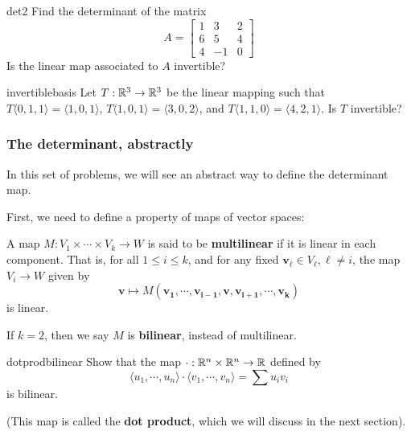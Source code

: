 \begin{problem}{det2}
     Find the determinant of the matrix \begin{equation*}
A = 
\begin{bmatrix}
1 & 3 & 2 \\
6 & 5 & 4 \\
4 & -1 & 0
\end{bmatrix}
\end{equation*}
Is the linear map associated to $A$ invertible?
\end{problem}

\begin{problem}{invertiblebasis}
    Let $T : \mathbb{R}^3 \to \mathbb{R}^3$ be the linear mapping such that $T\langle0,1,1\rangle = \langle1,0,1\rangle$, $T\langle1,0,1\rangle = \langle3,0,2\rangle$, and $T\langle1,1,0\rangle = \langle4,2,1\rangle$.  Is $T$ invertible?
\end{problem}


\subsubsection{The determinant, abstractly}\label{detabstractly}

In this set of problems, we will see an abstract way to define the determinant map.  

First, we need to define a property of maps of vector spaces:

\begin{definition}
    A map $M : V_1 \times \cdots \times V_k \to W$ is said to be \textbf{multilinear} if it is linear in each component.  That is, for all $1 \leq i \leq k$, and for any fixed $\bm{v_\ell} \in V_\ell, \ell \neq i$, the map $V_i \to W$ given by $$\bm{v} \mapsto M(\bm{v_1}, \cdots, \bm{v_{i-1}}, \bm{v}, \bm{v_{i+1}}, \cdots, \bm{v_k})$$ is linear.
    
    If $k=2$, then we say $M$ is \textbf{bilinear}, instead of multilinear.
    \end{definition}

\begin{problem}{dotprodbilinear}
    Show that the map $\cdot : \mathbb{R}^n \times \mathbb{R}^n \to \mathbb{R}$ defined by $$\langle u_1, \cdots, u_n \rangle \cdot \langle v_1 , \cdots, v_n \rangle = \sum u_iv_i$$
    is bilinear. 
    
    (This map is called the \textbf{dot product}, which we will discuss in the next section). 
\end{problem}


